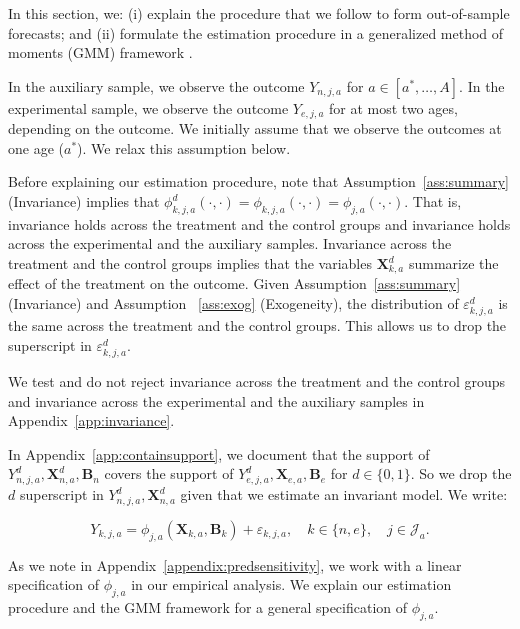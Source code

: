 \noindent In this section, we: (i) explain the procedure that we follow to form out-of-sample forecasts; and (ii) formulate the estimation procedure in a generalized method of moments (GMM) framework \citep{Hansen_1982_Econometrica}.

\noindent In the auxiliary sample, we observe the outcome $Y_{n,j,a}$ for $a \in [a^*, \ldots, A]$. In the experimental sample, we observe the outcome $Y_{e,j,a}$ for at most two ages, depending on the outcome. We initially assume that we observe the outcomes at one age ($a^*$). We relax this assumption below.

\noindent Before explaining our estimation procedure, note that Assumption~\ref{ass:summary} (Invariance) implies that $\phi_{k,j,a}^d \left (\cdot, \cdot \right) = \phi_{k,j,a}  \left (\cdot, \cdot \right) = \phi_{j,a}  \left (\cdot, \cdot \right)$. That is, invariance holds across the treatment and the control groups and invariance holds across the experimental and the auxiliary samples. Invariance across the treatment and the control groups implies that the variables $\bm{X}_{k,a}^d$ summarize the effect of the treatment on the outcome. Given Assumption~\ref{ass:summary} (Invariance)  and Assumption ~\ref{ass:exog} (Exogeneity), the distribution of $\varepsilon_{k,j,a}^d$ is the same across the treatment and the control groups. This allows us to drop the superscript in $\varepsilon_{k,j,a}^d$.

\noindent We test and do not reject invariance across the treatment and the control groups and invariance across the experimental and the auxiliary samples  in Appendix~\ref{app:invariance}.

\noindent In Appendix~\ref{app:containsupport}, we document that the support of $Y_{n,j,a}^d, \bm{X}_{n,a}^d, \bm{B}_{n}$ covers the support of $Y_{e,j,a}^d, \bm{X}_{e,a}, \bm{B}_{e}$ for $d \in \{0, 1\}$. So we drop the $d$ superscript in $Y_{n,j,a}^d, \bm{X}_{n,a}^d$ given that we estimate an invariant model. We write:

\begin{equation}\label{eq:routcome}
Y_{k,j,a} = \phi_{j,a} (\bm{X}_{k,a}, \bm{B}_k) + \varepsilon_{k,j,a}, \quad k \in \{n,e\}, \quad j \in \mathcal{J}_a.
\end{equation}

\noindent As we note in Appendix~\ref{appendix:predsensitivity}, we work with a linear specification of $\phi_{j,a}$ in our empirical analysis. We explain our estimation procedure and the GMM framework for a general specification of $\phi_{j,a}$.

